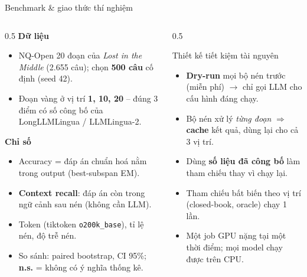 \documentclass[aspectratio=169,11pt]{beamer}
\begin{document}
\begin{frame}{Benchmark \& giao thức thí nghiệm}
  \begin{columns}[T]
    \begin{column}{0.5\textwidth}
      \small\textbf{\color{hustred}Dữ liệu}
      {\footnotesize
      \begin{itemize}\setlength\itemsep{0.2em}
        \item NQ-Open 20 đoạn của \emph{Lost in the Middle} (2.655 câu); chọn
          \textbf{500 câu} cố định (seed 42).
        \item Đoạn vàng ở vị trí \textbf{1, 10, 20} -- đúng 3 điểm có số công bố
          của LongLLMLingua / LLMLingua-2.
      \end{itemize}}
      \small\textbf{\color{hustred}Chỉ số}
      {\footnotesize
      \begin{itemize}\setlength\itemsep{0.2em}
        \item Accuracy = đáp án chuẩn hoá nằm trong output (best-subspan EM).
        \item \textbf{Context recall}: đáp án còn trong ngữ cảnh sau nén (không cần LLM).
        \item Token (tiktoken \texttt{o200k\_base}), tỉ lệ nén, độ trễ nén.
        \item So sánh: paired bootstrap, CI 95\%; \textbf{n.s.} = không có ý nghĩa thống kê.
      \end{itemize}}
    \end{column}
    \begin{column}{0.5\textwidth}
      \begin{block}{\small Thiết kế tiết kiệm tài nguyên}
        \footnotesize
        \begin{itemize}\setlength\itemsep{0.2em}
          \item \textbf{Dry-run} mọi bộ nén trước (miễn phí) $\to$ chỉ gọi LLM cho cấu hình đáng chạy.
          \item Bộ nén xử lý \emph{từng đoạn} $\Rightarrow$ \textbf{cache} kết quả, dùng lại cho cả 3 vị trí.
          \item Dùng \textbf{số liệu đã công bố} làm tham chiếu thay vì chạy lại.
          \item Tham chiếu bất biến theo vị trí (closed-book, oracle) chạy 1 lần.
          \item Một job GPU nặng tại một thời điểm; mọi model chạy được trên CPU.
        \end{itemize}
      \end{block}
    \end{column}
  \end{columns}
\end{frame}
\end{document}
